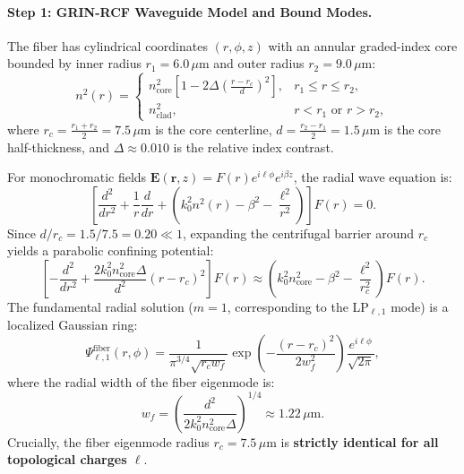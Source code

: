 \documentclass{optica-article}
\begin{document}
\paragraph{Step 1: GRIN-RCF Waveguide Model and Bound Modes.}
The fiber has cylindrical coordinates $(r, \phi, z)$ with an annular graded-index core bounded by inner radius $r_1 = 6.0\,\mu\text{m}$ and outer radius $r_2 = 9.0\,\mu\text{m}$:
\begin{equation}
n^2(r) = \begin{cases}
n_{\text{core}}^2 \left[ 1 - 2\Delta \left( \frac{r - r_c}{d} \right)^2 \right], & r_1 \le r \le r_2, \\
n_{\text{clad}}^2, & r < r_1 \text{ or } r > r_2,
\end{cases}
\label{eq:rcf_profile}
\end{equation}
where $r_c = \frac{r_1 + r_2}{2} = 7.5\,\mu\text{m}$ is the core centerline, $d = \frac{r_2 - r_1}{2} = 1.5\,\mu\text{m}$ is the core half-thickness, and $\Delta \approx 0.010$ is the relative index contrast.

For monochromatic fields $\mathbf{E}(\mathbf{r}, z) = F(r) e^{i \ell \phi} e^{i \beta z}$, the radial wave equation is:
\begin{equation}
\left[ \frac{d^2}{dr^2} + \frac{1}{r} \frac{d}{dr} + \left( k_0^2 n^2(r) - \beta^2 - \frac{\ell^2}{r^2} \right) \right] F(r) = 0.
\label{eq:radial_wave_rcf}
\end{equation}
Since $d / r_c = 1.5 / 7.5 = 0.20 \ll 1$, expanding the centrifugal barrier around $r_c$ yields a parabolic confining potential:
\begin{equation}
\left[ - \frac{d^2}{dr^2} + \frac{2 k_0^2 n_{\text{core}}^2 \Delta}{d^2} (r - r_c)^2 \right] F(r) \approx \left( k_0^2 n_{\text{core}}^2 - \beta^2 - \frac{\ell^2}{r_c^2} \right) F(r).
\label{eq:radial_parabolic_potential}
\end{equation}
The fundamental radial solution ($m=1$, corresponding to the LP$_{\ell, 1}$ mode) is a localized Gaussian ring:
\begin{equation}
\Psi_{\ell, 1}^{\text{fiber}}(r, \phi) = \frac{1}{\pi^{3/4} \sqrt{r_c w_f}} \exp\left( - \frac{(r - r_c)^2}{2 w_f^2} \right) \frac{e^{i \ell \phi}}{\sqrt{2\pi}},
\label{eq:fiber_eigenmode}
\end{equation}
where the radial width of the fiber eigenmode is:
\begin{equation}
w_f = \left( \frac{d^2}{2 k_0^2 n_{\text{core}}^2 \Delta} \right)^{1/4} \approx 1.22\,\mu\text{m}.
\label{eq:fiber_wf}
\end{equation}
Crucially, the fiber eigenmode radius $r_c = 7.5\,\mu\text{m}$ is \textbf{strictly identical for all topological charges $\ell$}.
\end{document}
